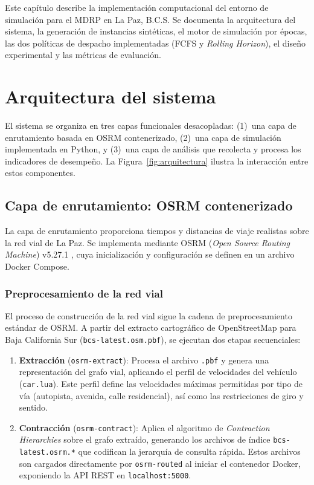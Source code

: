 \documentclass[12pt,letterpaper,oneside]{book}
\begin{document}
	Este capítulo describe la implementación computacional del entorno de simulación para el MDRP en La Paz, B.C.S.
	Se documenta la arquitectura del sistema, la generación de instancias sintéticas, el motor de simulación por 
	épocas, las dos políticas de despacho implementadas (FCFS y \textit{Rolling Horizon}), el diseño experimental y las
	métricas de evaluación.

	\section{Arquitectura del sistema}

	El sistema se organiza en tres capas funcionales desacopladas: (1)~una capa de enrutamiento basada en
	OSRM contenerizado, (2)~una capa de simulación implementada en Python, y (3)~una capa de
	análisis que recolecta y procesa los indicadores de desempeño. La Figura~\ref{fig:arquitectura} 
	ilustra la interacción entre estos componentes.

	\subsection{Capa de enrutamiento: OSRM contenerizado}

	La capa de enrutamiento proporciona tiempos y distancias de viaje realistas sobre la red vial de La Paz. 
	Se implementa mediante OSRM (\textit{Open Source Routing Machine}) v5.27.1 \citep{OSRMWiki2025}, cuya inicialización y 
	configuración se definen en un archivo Docker Compose.

	\subsubsection{Preprocesamiento de la red vial}

	El proceso de construcción de la red vial sigue la cadena de preprocesamiento estándar de OSRM. A partir 
	del extracto cartográfico de OpenStreetMap para Baja California Sur (\texttt{bcs-latest.osm.pbf}), se 
	ejecutan dos etapas secuenciales:

	\begin{enumerate}
		\item \textbf{Extracción} (\texttt{osrm-extract}): Procesa el archivo \texttt{.pbf} y genera una 
		representación del grafo vial, aplicando el perfil de velocidades del vehículo 
		(\texttt{car.lua}). Este perfil define las velocidades máximas permitidas por tipo de vía 
		(autopista, avenida, calle residencial), así como las restricciones de giro y sentido.
		
		\item \textbf{Contracción} (\texttt{osrm-contract}): Aplica el algoritmo de
		\textit{Contraction Hierarchies} \citep{Geisberger2008} sobre el grafo extraído,
		generando los archivos de índice \texttt{bcs-latest.osrm.*} que codifican la
		jerarquía de consulta rápida. Estos archivos son cargados directamente por
		\texttt{osrm-routed} al iniciar el contenedor Docker, exponiendo la API REST
		en \texttt{localhost:5000}.
	\end{enumerate}
\end{document}
